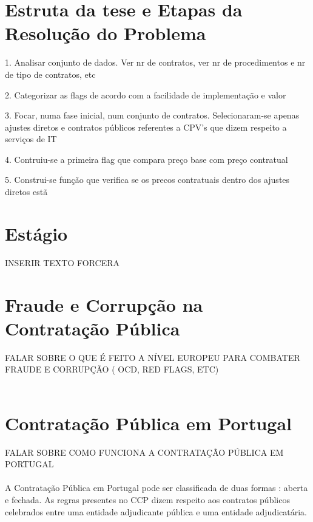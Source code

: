 \section{Estruta da tese e   Etapas da Resolução do Problema}

1. Analisar conjunto de dados. Ver nr de contratos, ver nr de procedimentos e nr de tipo de contratos, etc

2. Categorizar as flags de acordo com a facilidade de implementação e valor

3. Focar, numa fase inicial, num conjunto de contratos. Selecionaram-se apenas ajustes diretos e contratos públicos referentes a CPV's que dizem respeito a serviços de IT

4. Contruiu-se a primeira flag que compara preço base com preço contratual 

5. Construi-se função que verifica se os precos contratuais dentro dos ajustes diretos estã



\section{Estágio}

INSERIR TEXTO FORCERA

\section{Fraude e Corrupção na Contratação Pública}

FALAR SOBRE O QUE É FEITO A NÍVEL EUROPEU PARA COMBATER FRAUDE E CORRUPÇÃO ( OCD, RED FLAGS, ETC)
\\
\\


\section{Contratação Pública em Portugal}



FALAR SOBRE COMO FUNCIONA A CONTRATAÇÃO PÚBLICA EM PORTUGAL
\\
\\


A Contratação Pública em Portugal pode ser classificada de duas formas : aberta e fechada. As regras presentes no CCP dizem respeito aos contratos públicos celebrados entre uma entidade adjudicante pública e uma entidade adjudicatária.



